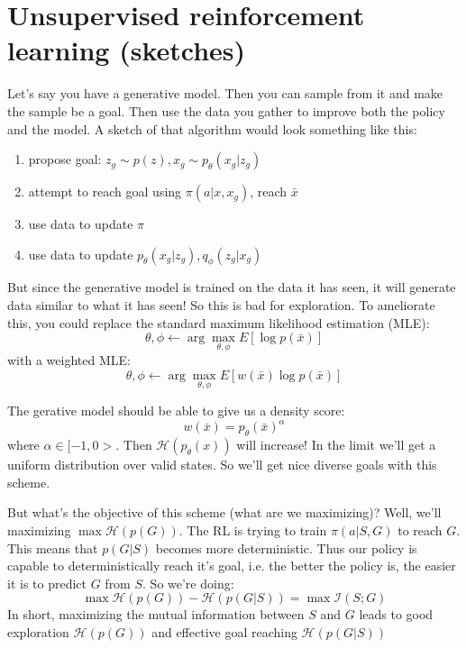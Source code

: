 \documentclass{report}
\newcommand{\argmax}{\arg\!\max}
\begin{document}
\section{Unsupervised reinforcement learning (sketches)}
Let's say you have a generative model. Then
you can sample from it and make the sample be a goal.
Then use the data you gather to improve both the policy and the model.
A sketch of that algorithm would look something like this:
\begin{enumerate}
		\item propose goal: $ z_g \sim p(z), x_g \sim p_\theta (x_g|z_g)  $
		\item attempt to reach goal using $ \pi(a|x,x_g)  $, reach $ \bar{x}  $
		\item use data to update $ \pi  $
		\item use data to update $ p_\theta(x_g|z_g), q_\phi(z_g|x_g)  $
\end{enumerate}

But since the generative model is trained on the data it has seen,
it will generate data similar to what it has seen!
So this is bad for exploration.
To ameliorate this, you could replace the standard maximum likelihood estimation (MLE):
\begin{equation}
		\theta, \phi \leftarrow \argmax_{\theta, \phi} E \left[ \log p(\bar{x}) \right] 
\end{equation}
with a weighted MLE:
\begin{equation}
		\theta, \phi \leftarrow \argmax_{\theta, \phi} E \left[ w(\bar{x}) \log p(\bar{x}) \right] 
\end{equation}

The gerative model should be able to give us a density score:
\begin{equation}
		w(\bar{x}) = p_\theta(\bar{x})^\alpha
\end{equation}
where $ \alpha \in [-1,0>  $.
Then $ \mathcal{H}(p_\theta(x))  $ will increase!
In the limit we'll get a uniform distribution over valid states.
So we'll get nice diverse goals with this scheme.

But what's the objective of this scheme (what are we maximizing)?
Well, we'll maximizing $ \max \mathcal{H}(p(G))  $.
The RL is trying to train $ \pi(a|S,G)  $ to reach $ G  $.
This means that $ p(G|S)  $ becomes more deterministic.
Thus our policy is capable to deterministically reach it's goal,
i.e. the better the policy is, the easier it is to predict $G$ from $S$.
So we're doing:
\begin{equation}
		\max \mathcal{H}(p(G)) - \mathcal{H}(p(G|S)) = \max \mathcal{I}(S;G)
\end{equation}
In short, maximizing the mutual information between $ S  $ and $ G  $ leads to
good exploration $ \mathcal{H}(p(G))  $ and effective goal reaching $\mathcal{H}(p(G|S))  $
\end{document}
